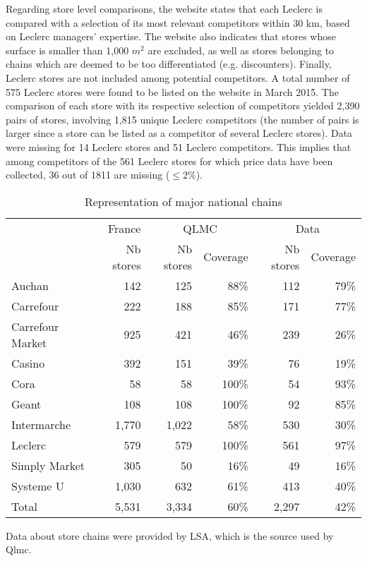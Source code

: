 \documentclass[english]{article}
\begin{document}
Regarding store level comparisons, the website states that each Leclerc is compared with a selection of its most relevant competitors within 30 km, based on Leclerc managers' expertise. The website also indicates that stores whose surface is smaller than 1,000 $m^2$ are excluded, as well as stores belonging to chains which are deemed to be too differentiated (e.g. discounters). Finally, Leclerc stores are not included among potential competitors. A total number of 575 Leclerc stores were found to be listed on the website in March 2015. The comparison of each store with its respective selection of competitors yielded 2,390 pairs of stores, involving 1,815 unique Leclerc competitors (the number of pairs is larger since a store can be listed as a competitor of several Leclerc stores). Data were missing for 14 Leclerc stores and 51 Leclerc competitors. This implies that among competitors of the 561 Leclerc stores for which price data have been collected, 36 out of 1811 are missing ($\le 2 \%$).

\begin{table}[H]
\begin{threeparttable}
\renewcommand{\arraystretch}{0.7}%
\caption{Representation of major national chains}
\label{tab:qlmc_chain_repr}
\small
\begin{tabular}{lr|rr|rr}
\toprule
          & France & \multicolumn{2}{c|}{QLMC} & \multicolumn{2}{c}{Data} \\
          & Nb stores & Nb stores & Coverage & Nb stores & Coverage \\
\midrule
    Auchan & 142   & 125   & 88\%  & 112   & 79\% \\
    Carrefour & 222   & 188   & 85\%  & 171   & 77\% \\
    Carrefour Market & 925   & 421   & 46\%  & 239   & 26\% \\
    Casino & 392   & 151   & 39\%  & 76    & 19\% \\
    Cora  & 58    & 58    & 100\% & 54    & 93\% \\
    Geant & 108   & 108   & 100\% & 92    & 85\% \\
    Intermarche & 1,770 & 1,022 & 58\%  & 530   & 30\% \\
    Leclerc & 579   & 579   & 100\% & 561   & 97\% \\
    Simply Market & 305   & 50    & 16\%  & 49    & 16\% \\
    Systeme U & 1,030 & 632   & 61\%  & 413   & 40\% \\
\midrule		
    Total & 5,531 & 3,334 & 60\%  & 2,297 & 42\% \\
\bottomrule
\bottomrule
\end{tabular}
\begin{tablenotes}
      \small
      \item Data about store chains were provided by LSA, which is the source used by Qlmc.
\end{tablenotes}
\end{threeparttable}
\end{table}
\end{document}
